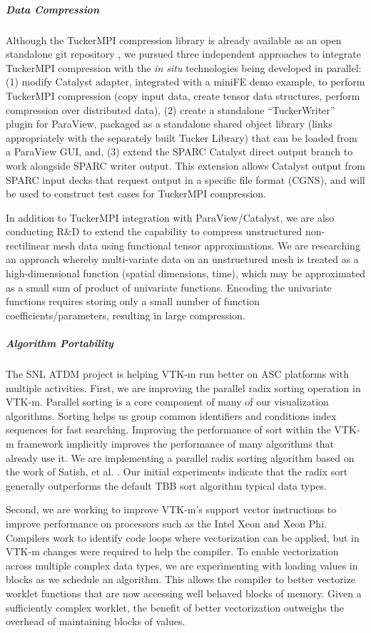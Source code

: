 \subparagraph{Data Compression}
Although the TuckerMPI compression library is already available as an open standalone git repository \cite{TuckerMPI-git}, we pursued three independent
approaches to integrate TuckerMPI compression with the \emph{in situ} technologies being developed in parallel: (1) modify Catalyst adapter, integrated 
with a miniFE demo example, to perform TuckerMPI compression (copy input data, create tensor data structures, perform compression over distributed data), 
(2) create a standalone ``TuckerWriter'' plugin for ParaView, packaged as a standalone shared object library (links appropriately with the separately 
built Tucker Library) that can be loaded from a ParaView GUI, and, (3) extend the SPARC Catalyst direct output branch to work alongside SPARC writer output. 
This extension allows Catalyst output from SPARC input decks that request output in a specific file format (CGNS), and will be used to construct test 
cases for TuckerMPI compression.

In addition to TuckerMPI integration with ParaView/Catalyst, we are also conducting R\&D to extend the capability to
compress unstructured non-rectilinear mesh data using functional tensor approximations. We are researching an approach whereby multi-variate data on an 
unstructured mesh is treated as a high-dimensional function (spatial dimensions, time), which may be approximated as a small sum of product of univariate 
functions. Encoding the univariate functions requires storing only a small number of function coefficients/parameters, resulting in large compression.  

\subparagraph{Algorithm Portability}
The SNL ATDM project is helping VTK-m run better on ASC platforms with multiple activities.
First, we are improving the parallel radix sorting operation in VTK-m.
Parallel sorting is a core component of many of our visualization algorithms.
Sorting helps us group common identifiers and conditions index sequences for fast searching.
Improving the performance of sort within the VTK-m framework implicitly improves the performance of many algorithms that already use it.
We are implementing a parallel radix sorting algorithm based on the work of Satish, et al. \cite{Satish2010}.
Our initial experiments indicate that the radix sort generally outperforms the default TBB sort algorithm typical data types.

Second, we are working to improve VTK-m's support vector instructions to improve performance on processors such as the Intel Xeon and Xeon Phi.
Compilers work to identify code loops where vectorization can be applied, but in VTK-m changes were required to help the compiler.
To enable vectorization across multiple complex data types, we are experimenting with loading values in blocks as we schedule an algorithm.
This allows the compiler to better vectorize worklet functions that are now accessing well behaved blocks of memory.
Given a sufficiently complex worklet, the benefit of better vectorization outweighs the overhead of maintaining blocks of values.

